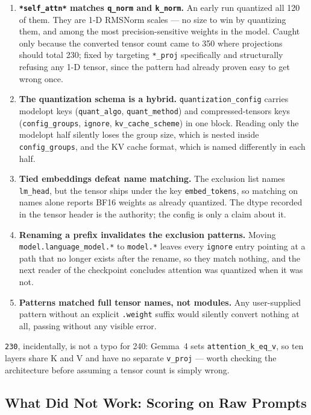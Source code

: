 \documentclass[11pt]{article}
\begin{document}
\begin{enumerate}[leftmargin=1.5em]
\item \textbf{\texttt{*self\_attn*} matches \texttt{q\_norm} and \texttt{k\_norm}.} An
  early run quantized all 120 of them. They are 1-D RMSNorm scales --- no size to win by
  quantizing them, and among the most precision-sensitive weights in the model. Caught
  only because the converted tensor count came to 350 where projections should total
  230; fixed by targeting \texttt{*\_proj} specifically and structurally refusing any
  1-D tensor, since the pattern had already proven easy to get wrong once.
\item \textbf{The quantization schema is a hybrid.} \texttt{quantization\_config}
  carries modelopt keys (\texttt{quant\_algo}, \texttt{quant\_method}) and
  compressed-tensors keys (\texttt{config\_groups}, \texttt{ignore},
  \texttt{kv\_cache\_scheme}) in one block. Reading only the modelopt half silently
  loses the group size, which is nested inside \texttt{config\_groups}, and the KV
  cache format, which is named differently in each half.
\item \textbf{Tied embeddings defeat name matching.} The exclusion list names
  \texttt{lm\_head}, but the tensor ships under the key \texttt{embed\_tokens}, so
  matching on names alone reports BF16 weights as already quantized. The dtype recorded
  in the tensor header is the authority; the config is only a claim about it.
\item \textbf{Renaming a prefix invalidates the exclusion patterns.} Moving
  \texttt{model.language\_model.*} to \texttt{model.*} leaves every \texttt{ignore}
  entry pointing at a path that no longer exists after the rename, so they match
  nothing, and the next reader of the checkpoint concludes attention was quantized when
  it was not.
\item \textbf{Patterns matched full tensor names, not modules.} Any user-supplied
  pattern without an explicit \texttt{.weight} suffix would silently convert nothing at
  all, passing without any visible error.
\end{enumerate}

\texttt{230}, incidentally, is not a typo for 240: Gemma~4 sets
\texttt{attention\_k\_eq\_v}, so ten layers share K and V and have no separate
\texttt{v\_proj} --- worth checking the architecture before assuming a tensor count is
simply wrong.

\subsection{What Did Not Work: Scoring on Raw Prompts}
\label{sec:gemma-rawprompts}
\end{document}
